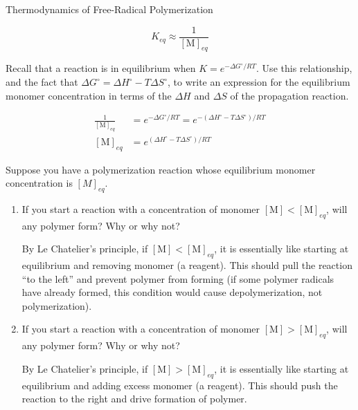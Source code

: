 \begin{activity}{Thermodynamics of Free-Radical Polymerization}
\begin{ctqs}
				\begin{solution}[0.5in]
					\begin{equation*}
						K_{eq}\approx \frac{1}{[\text{M}]_{eq}}
					\end{equation*}
				\end{solution}
	
	\question Recall that a reaction is in equilibrium when $K = e^{-\Delta G^\circ/RT}$.  Use this relationship, and the fact that $\Delta G^\circ = \Delta H^\circ - T\Delta S^\circ$, to write an  expression for the equilibrium monomer concentration in terms of the $\Delta H$ and $\Delta S$ of the propagation reaction. \label{\labelbase:ctq:Meq}
				
				\begin{solution}[1in]
					\begin{align*}
						\frac{1}{[\text{M}]_{eq}} &= e^{-\Delta G^\circ/RT} = e^{-(\Delta H^\circ - T\Delta S^\circ)/RT}\\
						[\text{M}]_{eq} &= e^{(\Delta H^\circ - T\Delta S^\circ)/RT}
					\end{align*}
				\end{solution}
	
	\question Suppose you have a polymerization reaction whose equilibrium monomer concentration is $[M]_{eq}$.  
		\begin{enumerate}
			\item If you start a reaction with a concentration of monomer $[\text{M}] < [\text{M}]_{eq}$, will any polymer form?  Why or why not?
				
				\begin{solution}[1in]
					By Le Chatelier's principle, if $[\text{M}] < [\text{M}]_{eq}$, it is essentially like starting at equilibrium and removing monomer (a reagent).  This should pull the reaction ``to the left'' and prevent polymer from forming (if some polymer radicals have already formed, this condition would cause depolymerization, not polymerization).
				\end{solution}
				
			\item If you start a reaction with a concentration of monomer $[\text{M}] > [\text{M}]_{eq}$, will any polymer form?  Why or why not?
				
				\begin{solution}[1in]
					By Le Chatelier's principle, if $[\text{M}] > [\text{M}]_{eq}$, it is essentially like starting at equilibrium and adding excess monomer (a reagent).  This should push the reaction to the right and drive formation of polymer.
				\end{solution}
				

\end{enumerate}
\end{ctqs}
\end{activity}
